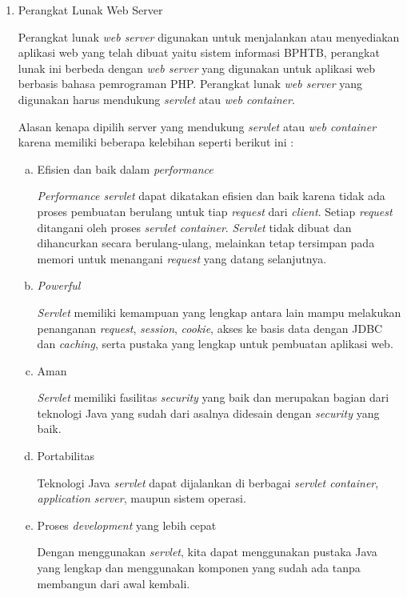\documentclass[pdftex,12pt, oneside]{article}
\begin{document}
\begin{enumerate}[1.]
  \item Perangkat Lunak Web Server
  
Perangkat lunak \textit{web server} digunakan untuk menjalankan atau menyediakan aplikasi web yang telah dibuat yaitu sistem informasi BPHTB, perangkat lunak ini berbeda dengan \textit{web server} yang digunakan untuk aplikasi web berbasis bahasa pemrograman PHP. Perangkat lunak \textit{web server} yang digunakan harus mendukung \textit{servlet} atau \textit{web container}.

Alasan kenapa dipilih server yang mendukung \textit{servlet} atau \textit{web container} karena memiliki beberapa kelebihan seperti berikut ini :

    \begin{enumerate}[a.]
      \item Efisien dan baik dalam \textit{performance}
      
      \textit{Performance servlet} dapat dikatakan efisien dan baik karena tidak ada proses pembuatan berulang untuk tiap \textit{request} dari \textit{client}. Setiap \textit{request} ditangani oleh proses \textit{servlet container}. \textit{Servlet} tidak dibuat dan dihancurkan secara berulang-ulang, melainkan tetap tersimpan pada memori untuk menangani \textit{request} yang datang selanjutnya.
      
      \item \textit{Powerful}
      
      \textit{Servlet} memiliki kemampuan yang lengkap antara lain mampu melakukan penanganan \textit{request}, \textit{session}, \textit{cookie}, akses ke basis data dengan JDBC dan \textit{caching}, serta pustaka yang lengkap untuk pembuatan aplikasi web.
      
      \item Aman
      
      \textit{Servlet} memiliki fasilitas \textit{security} yang baik dan merupakan bagian dari teknologi Java yang sudah dari asalnya didesain dengan \textit{security} yang baik.
      
      \item Portabilitas
      
      Teknologi Java \textit{servlet} dapat dijalankan di berbagai \textit{servlet container}, \textit{application server}, maupun sistem operasi.
      
      \item Proses \textit{development} yang lebih cepat
      
      Dengan menggunakan \textit{servlet}, kita dapat menggunakan pustaka Java yang lengkap dan menggunakan komponen yang sudah ada tanpa membangun dari awal kembali.
      

\end{enumerate}
\end{enumerate}
\end{document}
